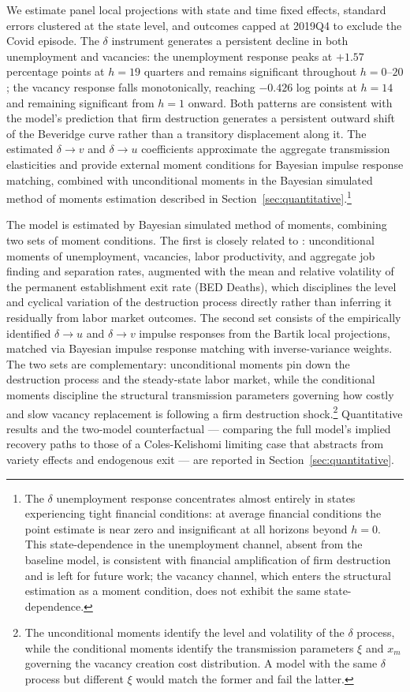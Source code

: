 \documentclass[authoryear, review, 12pt]{elsarticle}
\begin{document}
	We estimate panel local projections \citep{jorda_2005} with state and time fixed effects, 
	standard errors clustered at the state level, and outcomes capped 
	at 2019Q4 to exclude the Covid episode. The $\delta$ instrument 
	generates a persistent decline in both unemployment and vacancies: 
	the unemployment response peaks at $+1.57$ percentage points at 
	$h=19$ quarters and remains significant throughout $h=0$--$20$; 
	the vacancy response falls monotonically, reaching $-0.426$ log 
	points at $h=14$ and remaining significant from $h=1$ onward. 
	Both patterns are consistent with the model's prediction that firm 
	destruction generates a persistent outward shift of the Beveridge 
	curve rather than a transitory displacement along it.
	The estimated $\delta\to v$ and $\delta\to u$ coefficients 
	approximate the aggregate transmission elasticities and provide 
	external moment conditions for Bayesian impulse response matching, combined with unconditional moments in the Bayesian simulated 
	method of moments estimation described in 
	Section~\ref{sec:quantitative}.\footnote{The $\delta$ unemployment response concentrates almost entirely in states experiencing tight 
		financial conditions: at average financial conditions the point 
		estimate is near zero and insignificant at all horizons beyond 
		$h=0$. This state-dependence in the unemployment channel, absent 
		from the baseline model, is consistent with financial 
		amplification of firm destruction and is left for future work; 
		the vacancy channel, which enters the structural estimation as a 
		moment condition, does not exhibit the same state-dependence.}
	
	The model is estimated by Bayesian simulated method of moments, 
	combining two sets of moment conditions. The first is closely related to \citet{coles_2018}: unconditional moments of 
	unemployment, vacancies, labor productivity, and aggregate job 
	finding and separation rates, augmented with the mean and 
	relative volatility of the permanent establishment exit rate (BED Deaths), which disciplines the level and cyclical variation of the destruction process directly rather than inferring it residually from labor market outcomes. The second set consists of the empirically identified $\delta\to u$ and $\delta\to v$ impulse responses from the Bartik local projections, matched via Bayesian impulse response matching with inverse-variance weights. The two sets are complementary: unconditional moments pin down the destruction process and the steady-state labor market, while the 
	conditional moments discipline the structural transmission 
	parameters governing how costly and slow vacancy replacement is 
	following a firm destruction shock.\footnote{The unconditional moments identify the level and 
		volatility of the $\delta$ process, while the conditional moments 
		identify the transmission parameters $\xi$ and $x_m$ governing 
		the vacancy creation cost distribution. A model with the same 
		$\delta$ process but different $\xi$ would match the former and 
		fail the latter.} Quantitative results and the two-model 
	counterfactual --- comparing the full model's implied recovery 
	paths to those of a Coles-Kelishomi limiting case that abstracts 
	from variety effects and endogenous exit --- are reported in 
	Section~\ref{sec:quantitative}.	
	
\end{document}
